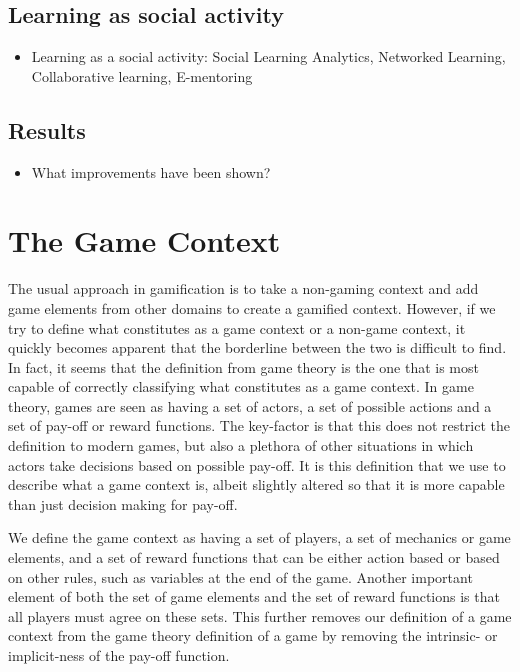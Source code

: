 \documentclass[11pt]{article}
\begin{document}
\subsection{Learning as social activity}
\begin{itemize}
\item Learning as a social activity: Social Learning Analytics, Networked Learning, Collaborative learning, E-mentoring
\end{itemize}
\subsection{Results}
\begin{itemize}
\item What improvements have been shown?
\end{itemize}


\section{The Game Context}
\label{sec:thegamecontext}
The usual approach in gamification is to take a non-gaming context and add game elements from other domains to create a gamified context. However, if we try to define what constitutes as a game context or a non-game context, it quickly becomes apparent that the borderline between the two is difficult to find. In fact, it seems that the definition from game theory is the one that is most capable of correctly classifying what constitutes as a game context. In game theory, games are seen as having a set of actors, a set of possible actions and a set of pay-off or reward functions. The key-factor is that this does not restrict the definition to modern games, but also a plethora of other situations in which actors take decisions based on possible pay-off. It is this definition that we use to describe what a game context is, albeit slightly altered so that it is more capable than just decision making for pay-off.

We define the game context as having a set of players, a set of mechanics or game elements, and a set of reward functions that can be either action based or based on other rules, such as variables at the end of the game. Another important element of both the set of game elements and the set of reward functions is that all players must agree on these sets. This further removes our definition of a game context from the game theory definition of a game by removing the intrinsic- or implicit-ness of the pay-off function.
\end{document}
